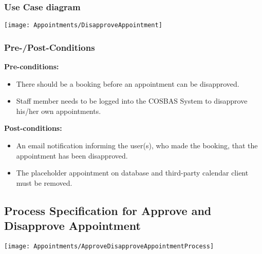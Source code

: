 \subsubsection{Use Case diagram}
\texttt{[image: Appointments/DisapproveAppointment]}

\subsubsection{Pre-/Post-Conditions}\textbf{Pre-conditions:} 
	\begin{itemize}
		\item There should be a booking before an appointment can be disapproved.
		\item Staff member needs to be logged into the COSBAS System to disapprove his/her own appointments.
	\end{itemize}
\textbf{ Post-conditions:} 
	\begin{itemize}
		\item An email notification informing the user(s), who made the booking, that the appointment has been disapproved.
		\item The placeholder appointment on database and third-party calendar client must be removed.
	\end{itemize}	

\subsection{Process Specification for Approve and Disapprove Appointment}
	\texttt{[image: Appointments/ApproveDisapproveAppointmentProcess]}	